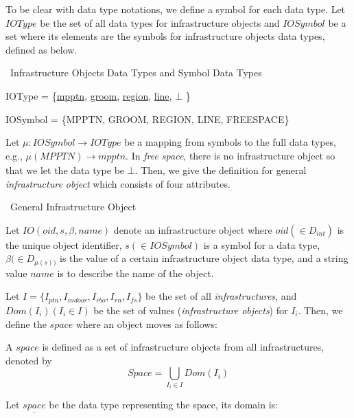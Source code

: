 To be clear with data type notations, we define a symbol for each data type. Let $IOType$ be the set of all data types for infrastructure objects and $IOSymbol$ be a set where its elements are the symbols for infrastructure objects data types, defined as below.  \\

\begin{Statement}
\label{infraobjectsymbol}
\ Infrastructure Objects Data Types and Symbol Data Types 

IOType = \{\underline{mpptn}, \underline{groom}, \underline{region}, \underline{line}, $\bot$ \}

IOSymbol = \{MPPTN, GROOM, REGION, LINE, FREESPACE\}

\end{Statement}

Let $\mu:IOSymbol \rightarrow IOType$ be a mapping from symbols to the full data types, e.g., 
$\mu(MPPTN)\rightarrow \underline{mpptn}$. In \textit{free space}, there is no infrastructure object so that we let the data type be $\bot$. Then, we give the definition for general  \textit{infrastructure object} which consists of four attributes. \\

\begin{Statement}
\label{infraobject}
\ General Infrastructure Object 

Let $IO(oid,s,\beta, name)$ denote an 
infrastructure object where $oid (\in D_{\underline{int}})$ is the unique object identifier, $s(\in IOSymbol)$ is a symbol for a data type, $\beta (\in D_{\mu(s))}$ is the value of a certain infrastructure object data type, and a string value $name$ is to describe the name of the object.
\end{Statement}


Let $I=\{I_{ptn},I_{indoor},I_{rbo},I_{rn},I_{fs}\}$ be the set 
of all \textit{infrastructures}, and $Dom(I_i)(I_i \in I)$ be the set of values 
(\textit{infrastructure objects}) for $I_i$. Then, we define the $space$ where an 
object moves as follows: 

\begin{Statement}
\label{space}

A $space$ is defined as a set of infrastructure objects from all infrastructures, 
denoted by
\[
 Space=\bigcup_{I_i \in I}Dom(I_i)
\]
\end{Statement}

Let $\underline{space}$ be the data type representing the space, its domain is: \\

